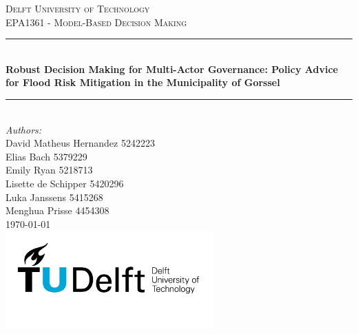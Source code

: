 \documentclass[a4paper]{article}
\begin{document}
\begin{titlepage}

\newcommand{\HRule}{\rule{\linewidth}{0.5mm}} 				
\center 
 
\textsc{\LARGE Delft University of Technology}\\[1cm]

\textsc{\large EPA1361 - Model-Based Decision Making}\\[1cm] 
\HRule \\[0.8cm]
{ \huge \bfseries Robust Decision Making for Multi-Actor Governance: Policy Advice for Flood Risk Mitigation in the Municipality of Gorssel}\\[0.7cm] 
\HRule \\[2cm]

\large\emph{Authors:}\\
\bigskip 
David Matheus Hernandez 5242223\\ 
Elias Bach 5379229 \\ 
Emily Ryan 5218713 \\
Lisette de Schipper 5420296 \\ 
Luka Janssens 5415268 \\ 
Menghua Prisse 4454308 \\[1.5cm]
												
{\large \today}\\[4cm]

\includegraphics[width=0.6\textwidth]{figures/TU_delft_logo.jpg}\\[1cm] 
\vfill 

\end{titlepage}





\newpage

\end{document}
